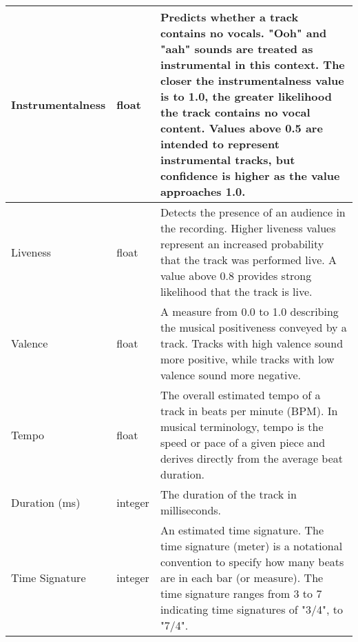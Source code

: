 \begin{table}[ht]
{\begin{tabular}{|>{\raggedright\arraybackslash}p{}|>{\raggedright\arraybackslash}p{}|>{\raggedright\arraybackslash}p{}|}
    Instrumentalness & float & Predicts whether a track contains no vocals. "Ooh" and "aah" sounds are treated as instrumental in this context. The closer the instrumentalness value is to 1.0, the greater likelihood the track contains no vocal content. Values above 0.5 are intended to represent instrumental tracks, but confidence is higher as the value approaches 1.0. \\
    \hline
    Liveness & float & Detects the presence of an audience in the recording. Higher liveness values represent an increased probability that the track was performed live. A value above 0.8 provides strong likelihood that the track is live. \\
    \hline
    Valence & float & A measure from 0.0 to 1.0 describing the musical positiveness conveyed by a track. Tracks with high valence sound more positive, while tracks with low valence sound more negative. \\
    \hline
    Tempo & float & The overall estimated tempo of a track in beats per minute (BPM). In musical terminology, tempo is the speed or pace of a given piece and derives directly from the average beat duration. \\
    \hline
    Duration (ms) & integer & The duration of the track in milliseconds. \\
    \hline
    Time Signature & integer & An estimated time signature. The time signature (meter) is a notational convention to specify how many beats are in each bar (or measure). The time signature ranges from 3 to 7 indicating time signatures of "3/4", to "7/4". \\
    \hline  
    \end{tabular}
    }
\end{table}